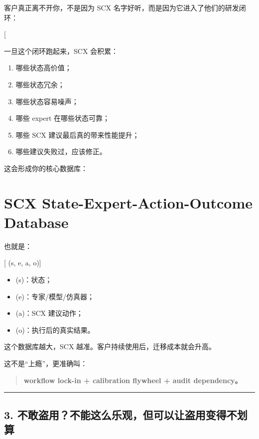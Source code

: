 \documentclass[
  12pt,
]{ctexart}
\providecommand{\tightlist}{%
  \setlength{\itemsep}{0pt}\setlength{\parskip}{0pt}}
\begin{document}
客户真正离不开你，不是因为 SCX
名字好听，而是因为它进入了他们的研发闭环：

{[}  \rightarrow {}
\rightarrow {} \rightarrow {}
\rightarrow \text{SCX校准}{]}

一旦这个闭环跑起来，SCX 会积累：

\begin{enumerate}
\def\labelenumi{\arabic{enumi}.}
\tightlist
\item
  哪些状态高价值；
\item
  哪些状态冗余；
\item
  哪些状态容易噪声；
\item
  哪些 expert 在哪些状态可靠；
\item
  哪些 SCX 建议最后真的带来性能提升；
\item
  哪些建议失败过，应该修正。
\end{enumerate}

这会形成你的核心数据库：

\section{\texorpdfstring{\textbf{SCX State-Expert-Action-Outcome
Database}}{SCX State-Expert-Action-Outcome Database}}\label{scx-state-expert-action-outcome-database}

也就是：

{[} (s, e, a, o){]}

\begin{itemize}
\tightlist
\item
  (s)：状态；
\item
  (e)：专家/模型/仿真器；
\item
  (a)：SCX 建议动作；
\item
  (o)：执行后的真实结果。
\end{itemize}

这个数据库越大，SCX 越准。客户持续使用后，迁移成本就会升高。

这不是``上瘾''，更准确叫：

\begin{quote}
\textbf{workflow lock-in + calibration flywheel + audit dependency。}
\end{quote}

\begin{center}\rule{0.5\linewidth}{0.5pt}\end{center}

\subsection{3.
不敢盗用？不能这么乐观，但可以让盗用变得不划算}\label{ux4e0dux6562ux76d7ux7528ux4e0dux80fdux8fd9ux4e48ux4e50ux89c2ux4f46ux53efux4ee5ux8ba9ux76d7ux7528ux53d8ux5f97ux4e0dux5212ux7b97}
\end{document}
